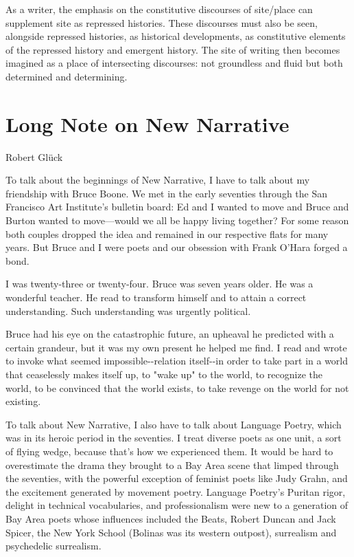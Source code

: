 As a writer, the emphasis on the constitutive discourses of site/place
can supplement site as repressed histories. These discourses must also
be seen, alongside repressed histories, as historical developments, as
constitutive elements of the repressed history and emergent history. The
site of writing then becomes imagined as a place of intersecting
discourses: not groundless and fluid but both determined and
determining.

\hypertarget{long-note-on-new-narrative}{%
\section{Long Note on New Narrative}\label{long-note-on-new-narrative}}

Robert Glück

To talk about the beginnings of New Narrative, I have to talk about my
friendship with Bruce Boone. We met in the early seventies through the
San Francisco Art Institute's bulletin board: Ed and I wanted to move
and Bruce and Burton wanted to move---would we all be happy living
together? For some reason both couples dropped the idea and remained in
our respective flats for many years. But Bruce and I were poets and our
obsession with Frank O'Hara forged a bond.

I was twenty-three or twenty-four. Bruce was seven years older. He was a
wonderful teacher. He read to transform himself and to attain a correct
understanding. Such understanding was urgently political.

Bruce had his eye on the catastrophic future, an upheaval he predicted
with a certain grandeur, but it was my own present he helped me find. I
read and wrote to invoke what seemed impossible-\/-relation itself-\/-in
order to take part in a world that ceaselessly makes itself up, to "wake
up" to the world, to recognize the world, to be convinced that the world
exists, to take revenge on the world for not existing.

To talk about New Narrative, I also have to talk about Language Poetry,
which was in its heroic period in the seventies. I treat diverse poets
as one unit, a sort of flying wedge, because that's how we experienced
them. It would be hard to overestimate the drama they brought to a Bay
Area scene that limped through the seventies, with the powerful
exception of feminist poets like Judy Grahn, and the excitement
generated by movement poetry. Language Poetry's Puritan rigor, delight
in technical vocabularies, and professionalism were new to a generation
of Bay Area poets whose influences included the Beats, Robert Duncan and
Jack Spicer, the New York School (Bolinas was its western outpost),
surrealism and psychedelic surrealism.

